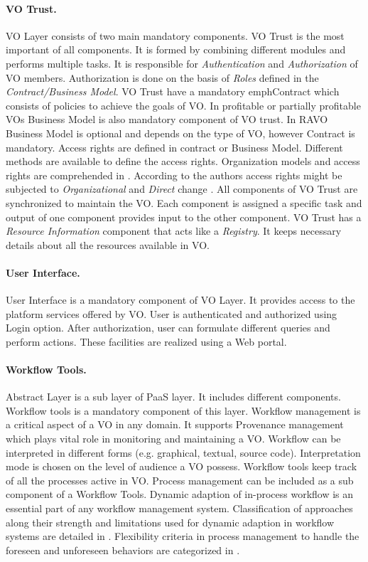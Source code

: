 \documentclass[]{article}
\begin{document}
\paragraph{VO Trust.}
VO Layer consists of two main mandatory components. VO Trust is the most important of all components. It is formed by combining different modules and performs multiple tasks. It is responsible for \emph{Authentication} and \emph{Authorization} of VO members. Authorization is done on the basis of \emph{Roles} defined in the \emph{Contract/Business Model}. VO Trust have a mandatory emph{Contract} which consists of policies to achieve the goals of VO. In profitable or partially profitable VOs Business Model is also mandatory component of VO trust. In RAVO Business Model is optional and depends on the type of VO, however Contract is mandatory. Access rights are defined in contract or Business Model. Different methods are available to define the access rights. Organization models and access rights are comprehended in \cite{Rinder2008}. According to the authors access rights might be subjected to \emph{Organizational} and \emph{Direct} change \cite{Rinder2008}.  All components of VO Trust are synchronized to maintain the VO. Each component is assigned a specific task and output of one component provides input to the other component.  VO Trust has a \emph{Resource Information} component that acts like a \emph{Registry}. It keeps necessary details about all the resources available in VO.
\paragraph{User Interface.}
User Interface is a mandatory component of VO Layer. It provides access to the platform services offered by VO. User is authenticated and authorized using Login option. After authorization, user can formulate different queries and perform actions. These facilities are realized using a Web portal.
\paragraph{Workflow Tools.}
Abstract Layer is a sub layer of PaaS layer. It includes different components. Workflow tools is a mandatory component of this layer. Workflow management is a critical aspect of a VO in any domain. It supports Provenance management which plays vital role in monitoring and maintaining a VO. Workflow can be interpreted in different forms (e.g. graphical, textual, source code). Interpretation mode is chosen on the level of audience a VO possess. Workflow tools keep track of all the processes active in VO. Process management can be included as a sub component of a Workflow Tools. Dynamic adaption of in-process workflow is an essential part of any workflow management system. Classification of approaches along their strength and limitations used for dynamic adaption in workflow systems are detailed in \cite{Rinder2004}. Flexibility criteria in process management to handle the foreseen and unforeseen behaviors are categorized in \cite{FProcess2008}.
\end{document}
